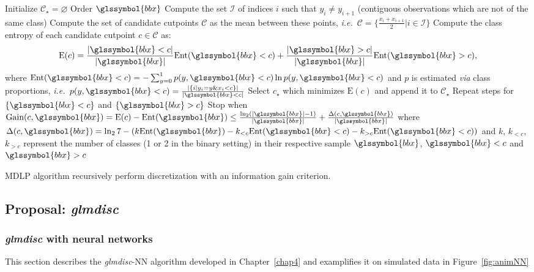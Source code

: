 \begin{algorithm}[H]
 Initialize $\mathcal{C}_\star = \varnothing$\;
Order $\glssymbol{bbx}$\;
Compute the set $\mathcal{I}$ of indices $i$ such that $y_i \neq y_{i+1}$ (contiguous observations which are not of the same class)\;
Compute the set of candidate cutpoints $\mathcal{C}$ as the mean between these points, \textit{i.e.}\ $\mathcal{C} = \{\frac{x_i + x_{i+1}}{2} | i \in \mathcal{I} \}$\;
Compute the class entropy of each candidate cutpoint $c \in \mathcal{C}$ as:
\[ \text{E}(c) = \frac{|\glssymbol{bbx} < c|}{|\glssymbol{bbx}|} \text{Ent}(\glssymbol{bbx} < c) + \frac{|\glssymbol{bbx} > c|}{|\glssymbol{bbx}|} \text{Ent}(\glssymbol{bbx} > c), \]
where $\text{Ent}(\glssymbol{bbx} < c) = - \sum_{y=0}^1 p(y,\glssymbol{bbx} < c) \ln p(y,\glssymbol{bbx} < c)$ and $p$ is estimated \textit{via} class proportions, \textit{i.e.}\ $p(y,\glssymbol{bbx} < c) = \frac{|\{i | y_i = y \& x_i < c \}|}{|\glssymbol{bbx} < c|}$\;
Select $c_\star$ which minimizes $\text{E}(c)$ and append it to $\mathcal{C}_\star$\;
Repeat steps for $\{\glssymbol{bbx}< c\}$ and $\{\glssymbol{bbx} > c\}$\;
Stop when $\text{Gain}(c,\glssymbol{bbx}) = \text{E}(c) - \text{Ent}(\glssymbol{bbx}) \leq \frac{\ln_2 (|\glssymbol{bbx}|-1)}{|\glssymbol{bbx}|} + \frac{\Delta(c,\glssymbol{bbx}) }{|\glssymbol{bbx}|}$ where $\Delta(c,\glssymbol{bbx}) = \ln_2 7 - (k \text{Ent}(\glssymbol{bbx}) - k_{<c}\text{Ent}(\glssymbol{bbx} < c) - k_{>c}\text{Ent}(\glssymbol{bbx} < c))$ and $k$, $k_{<c}$, $k_{>c}$ represent the number of classes (1 or 2 in the binary setting) in their respective sample $\glssymbol{bbx}$, $\glssymbol{bbx} < c$ and $\glssymbol{bbx} > c$\;
 \caption{\label{mdlp} MDLP algorithm recursively perform discretization with an information gain criterion.}
\end{algorithm}


\subsection{Proposal: \textit{glmdisc}}


\subsubsection{\textit{glmdisc} with neural networks} \label{app1:glmdiscNN}

This section describes the \textit{glmdisc}-NN algorithm developed in Chapter~\ref{chap4} and examplifies it on simulated data in Figure~\ref{fig:animNN}


